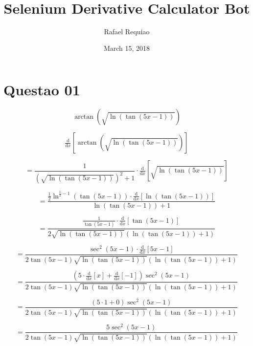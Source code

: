\documentclass[12pt,a4paper]{memoir}      %
\title{Selenium Derivative Calculator Bot}
\author{Rafael Requiao}
\date{March 15, 2018}
\newcommand {\class}[1]{ }       %
\newcommand {\cssId}[1]{ }
\begin{document}
\maketitle 

\section{Questao 01}


$$\arctan\left(\sqrt{\ln\left(\tan\left(5x-1\right)\right)}\right)$$

$$\class{steps-node}{\cssId{steps-node-1}{\tfrac{\mathrm{d}}{\mathrm{d}x}\left[\arctan\left(\sqrt{\ln\left(\tan\left(5x-1\right)\right)}\right)\right]}}$$

$$=\class{steps-node}{\cssId{steps-node-2}{\dfrac{1}{\left(\sqrt{\ln\left(\tan\left(5x-1\right)\right)}\right)^2+1}}}\cdot\class{steps-node}{\cssId{steps-node-3}{\tfrac{\mathrm{d}}{\mathrm{d}x}\left[\sqrt{\ln\left(\tan\left(5x-1\right)\right)}\right]}}$$

$$=\dfrac{\class{steps-node}{\cssId{steps-node-4}{\frac{1}{2}}}\class{steps-node}{\cssId{steps-node-5}{\ln^{\frac{1}{2}-1}\left(\tan\left(5x-1\right)\right)}}\cdot\class{steps-node}{\cssId{steps-node-6}{\tfrac{\mathrm{d}}{\mathrm{d}x}\left[\ln\left(\tan\left(5x-1\right)\right)\right]}}}{\ln\left(\tan\left(5x-1\right)\right)+1}$$

$$=\dfrac{\class{steps-node}{\cssId{steps-node-7}{\frac{1}{\tan\left(5x-1\right)}}}\cdot\class{steps-node}{\cssId{steps-node-8}{\tfrac{\mathrm{d}}{\mathrm{d}x}\left[\tan\left(5x-1\right)\right]}}}{2\sqrt{\ln\left(\tan\left(5x-1\right)\right)}\left(\ln\left(\tan\left(5x-1\right)\right)+1\right)}$$

$$=\dfrac{\class{steps-node}{\cssId{steps-node-9}{\sec^2\left(5x-1\right)}}\cdot\class{steps-node}{\cssId{steps-node-10}{\tfrac{\mathrm{d}}{\mathrm{d}x}\left[5x-1\right]}}}{2\tan\left(5x-1\right)\sqrt{\ln\left(\tan\left(5x-1\right)\right)}\left(\ln\left(\tan\left(5x-1\right)\right)+1\right)}$$

$$=\dfrac{\class{steps-node}{\cssId{steps-node-11}{\left(5\cdot\class{steps-node}{\cssId{steps-node-13}{\tfrac{\mathrm{d}}{\mathrm{d}x}\left[x\right]}}+\class{steps-node}{\cssId{steps-node-12}{\tfrac{\mathrm{d}}{\mathrm{d}x}\left[-1\right]}}\right)}}\sec^2\left(5x-1\right)}{2\tan\left(5x-1\right)\sqrt{\ln\left(\tan\left(5x-1\right)\right)}\left(\ln\left(\tan\left(5x-1\right)\right)+1\right)}$$

$$=\dfrac{\left(5\cdot\class{steps-node}{\cssId{steps-node-14}{1}}+\class{steps-node}{\cssId{steps-node-15}{0}}\right)\sec^2\left(5x-1\right)}{2\tan\left(5x-1\right)\sqrt{\ln\left(\tan\left(5x-1\right)\right)}\left(\ln\left(\tan\left(5x-1\right)\right)+1\right)}$$

$$=\dfrac{5\sec^2\left(5x-1\right)}{2\tan\left(5x-1\right)\sqrt{\ln\left(\tan\left(5x-1\right)\right)}\left(\ln\left(\tan\left(5x-1\right)\right)+1\right)}$$
\end{document}
